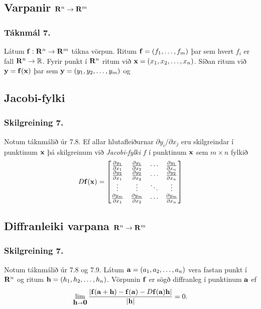 \subsection{Varpanir $\mbox{${\bf R}^n$}\rightarrow\mbox{${\bf R}^m$}$} 
\subsubsection{Táknmál 7.}
Látum $\mbox{${\bf f}$}:\mbox{${\bf R}^n$}\rightarrow\mbox{${\bf R}^m$}$ tákna vörpun.
Ritum $\mbox{${\bf f}$}=(f_1,\ldots,f_m)$ þar sem hvert $f_i$ er fall
$\mbox{${\bf R}^n$}\rightarrow{\mathbb R}$.  Fyrir punkt í $\mbox{${\bf R}^n$}$ ritum við
$\mbox{${\bf x}$}=(x_1,x_2,\ldots,x_n)$.  Síðan ritum við $\mbox{${\bf y}$}=\mbox{${\bf f}$}(\mbox{${\bf x}$})$ þar sem 
$\mbox{${\bf y}$}=(y_1,y_2,\ldots,y_m)$ og 




\subsection{Jacobi-fylki} 
 \subsubsection{Skilgreining 7.}
 Notum táknmálið úr 7.8.
Ef allar hlutafleiðurnar $\partial
y_i/\partial x_j$ eru skilgreindar í punktinum $\mbox{${\bf x}$}$ þá skilgreinum
við {\em Jacobi-fylki} $f$ í punktinum $\mbox{${\bf x}$}$ sem $m\times n$ fylkið
$$D\mbox{${\bf f}$}(\mbox{${\bf x}$})=\begin{bmatrix}
\frac{\partial y_1}{\partial x_1}&\frac{\partial y_1}{\partial x_2}&
\cdots&\frac{\partial y_1}{\partial x_n}\\
\frac{\partial y_2}{\partial x_1}&\frac{\partial y_2}{\partial x_2}&
\cdots&\frac{\partial y_2}{\partial x_n}\\
\vdots&\vdots&\ddots&\vdots\\
\frac{\partial y_m}{\partial x_1}&\frac{\partial y_m}{\partial x_2}&
\cdots&\frac{\partial y_m}{\partial x_n}
\end{bmatrix}$$



\subsection{Diffranleiki varpana $\mbox{${\bf R}^n$}\rightarrow\mbox{${\bf R}^m$}$} 
 \subsubsection{Skilgreining 7.}
 Notum táknmálið úr 7.8 og 7.9. Látum $\mbox{${\bf a}$}=(a_1, a_2, \ldots, a_n)$ vera fastan punkt í $\mbox{${\bf R}^n$}$ og ritum 
$\mbox{${\bf h}$}=(h_1,h_2,\ldots,h_n)$.  Vörpunin $\mbox{${\bf f}$}$ er
sögð diffranleg í punktinum $\mbox{${\bf a}$}$ ef
$$\lim_{\mbox{${\bf h}$}\rightarrow
  \mbox{${\bf 0}$}}\frac{|\mbox{${\bf f}$}(\mbox{${\bf a}$}+\mbox{${\bf h}$})-\mbox{${\bf f}$}(\mbox{${\bf a}$})-D\mbox{${\bf f}$}(\mbox{${\bf a}$})\mbox{${\bf h}$}|}{|\mbox{${\bf h}$}|}=0.$$ 

